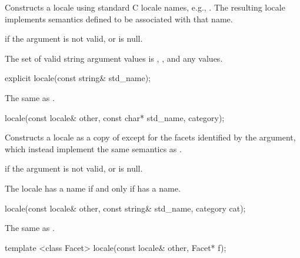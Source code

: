 \begin{itemdescr}
\pnum
\effects
Constructs a locale using standard C locale names, e.g., .
The resulting locale implements semantics defined to be associated
with that name.

\pnum
\throws
{}
if the argument is not valid, or is null.

\pnum
\notes
The set of valid string argument values is , ,
and any  values.
\end{itemdescr}

%
\begin{itemdecl}
explicit locale(const string& std_name);
\end{itemdecl}

\begin{itemdescr}
\pnum
\effects The same as .
\end{itemdescr}

%
\begin{itemdecl}
locale(const locale& other, const char* std_name, category);
\end{itemdecl}

\begin{itemdescr}
\pnum
\effects
Constructs a locale as a copy of
except for the facets identified by the
argument, which instead implement the same semantics as
.

\pnum
\throws
{}
if the argument is not valid, or is null.

\pnum
\notes
The locale has a name if and only if
has a name.
\end{itemdescr}

%
\begin{itemdecl}
locale(const locale& other, const string& std_name, category cat);
\end{itemdecl}

\begin{itemdescr}
\pnum
\effects The same as .
\end{itemdescr}

%
\begin{itemdecl}
template <class Facet> locale(const locale& other, Facet* f);
\end{itemdecl}

